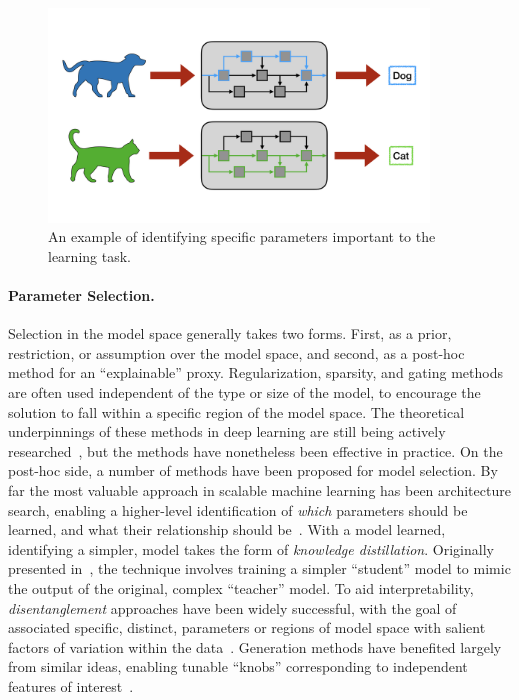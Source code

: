 \begin{figure}
    \centering
    \includegraphics[trim={0 3cm 0 3cm},clip,width=0.9\textwidth]{1_intro/figs/param_select.png}
    \caption[Visualization of parameter selection]{An example of identifying specific parameters important to the learning task.}
    \label{fig:param_select}
\end{figure}
\paragraph{Parameter Selection.} 
Selection in the model space generally takes two forms. First, as a prior, restriction, or assumption over the model space, and second, as a post-hoc method for an ``explainable'' proxy.
Regularization, sparsity, and gating methods are often used independent of the type or size of the model, to encourage the solution to fall within a specific region of the model space.
The theoretical underpinnings of these methods in deep learning are still being actively researched~\citep{hardt2016train,jacot2018neural,neyshabur2014search}, but the methods have nonetheless been effective in practice. 
On the post-hoc side,
a number of methods have been proposed for model selection.
By far the most valuable approach in scalable machine learning has been architecture search, enabling a higher-level identification of \textit{which} parameters should be learned, and what their relationship should be~\citep{elsken2019neural}.
With a model learned, identifying a simpler, model takes the form of \textit{knowledge distillation}.
Originally presented in~\cite{gou2021knowledge}, the technique involves training a simpler ``student'' model to mimic the output of the original, complex ``teacher'' model.
To aid interpretability, \textit{disentanglement} approaches have been widely successful,
with the goal of associated specific, distinct, parameters or regions of model space with salient factors of variation within the data~\citep{creager2019flexibly,locatello2019challenging}.
Generation methods have benefited largely from similar ideas, enabling tunable ``knobs'' corresponding to independent features of interest~\citep{higgins2017betavae,karras2019style,hjelm2018learning}.

